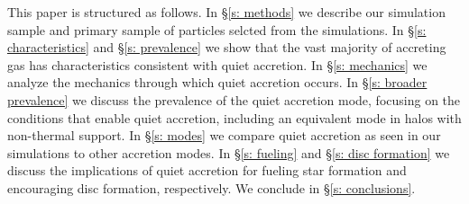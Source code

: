 \documentclass[fleqn,usenatbib]{mnras}
\begin{document}
This paper is structured as follows. 
In \S\ref{s: methods} we describe our simulation sample and primary sample of particles selcted from the simulations.
In \S\ref{s: characteristics} and \S\ref{s: prevalence} we show that the vast majority of accreting gas has characteristics consistent with quiet accretion.
In \S\ref{s: mechanics} we analyze the mechanics through which quiet accretion occurs.
In \S\ref{s: broader prevalence} we discuss the prevalence of the quiet accretion mode, focusing on the conditions that enable quiet accretion, including an equivalent mode in halos with non-thermal support.
In \S\ref{s: modes} we compare quiet accretion as seen in our simulations to other accretion modes.
In \S\ref{s: fueling} and \S\ref{s: disc formation} we discuss the implications of quiet accretion for fueling star formation and encouraging disc formation, respectively.
We conclude in \S\ref{s: conclusions}.


\end{document}
